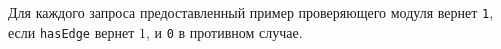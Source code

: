 Для каждого запроса предоставленный пример проверяющего модуля вернет \texttt{1}, если \texttt{hasEdge} вернет $1$, и \texttt{0} в противном случае.